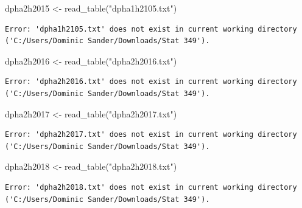 \documentclass[
  letterpaper,
  DIV=11,
  numbers=noendperiod]{scrreprt}
\newenvironment{Shaded}{\begin{snugshade}}{\end{snugshade}}
\newcommand{\FunctionTok}[1]{\textcolor[rgb]{0.28,0.35,0.67}{#1}}
\newcommand{\NormalTok}[1]{\textcolor[rgb]{0.00,0.23,0.31}{#1}}
\newcommand{\OtherTok}[1]{\textcolor[rgb]{0.00,0.23,0.31}{#1}}
\newcommand{\StringTok}[1]{\textcolor[rgb]{0.13,0.47,0.30}{#1}}
\begin{document}
\begin{Shaded}
\begin{Highlighting}[]
\NormalTok{dpha2h2015 }\OtherTok{\textless{}{-}} \FunctionTok{read\_table}\NormalTok{(}\StringTok{"dpha1h2105.txt"}\NormalTok{)}
\end{Highlighting}
\end{Shaded}

\begin{verbatim}
Error: 'dpha1h2105.txt' does not exist in current working directory ('C:/Users/Dominic Sander/Downloads/Stat 349').
\end{verbatim}

\begin{Shaded}
\begin{Highlighting}[]
\NormalTok{dpha2h2016 }\OtherTok{\textless{}{-}} \FunctionTok{read\_table}\NormalTok{(}\StringTok{"dpha2h2016.txt"}\NormalTok{)}
\end{Highlighting}
\end{Shaded}

\begin{verbatim}
Error: 'dpha2h2016.txt' does not exist in current working directory ('C:/Users/Dominic Sander/Downloads/Stat 349').
\end{verbatim}

\begin{Shaded}
\begin{Highlighting}[]
\NormalTok{dpha2h2017 }\OtherTok{\textless{}{-}} \FunctionTok{read\_table}\NormalTok{(}\StringTok{"dpha2h2017.txt"}\NormalTok{)}
\end{Highlighting}
\end{Shaded}

\begin{verbatim}
Error: 'dpha2h2017.txt' does not exist in current working directory ('C:/Users/Dominic Sander/Downloads/Stat 349').
\end{verbatim}

\begin{Shaded}
\begin{Highlighting}[]
\NormalTok{dpha2h2018 }\OtherTok{\textless{}{-}} \FunctionTok{read\_table}\NormalTok{(}\StringTok{"dpha2h2018.txt"}\NormalTok{)}
\end{Highlighting}
\end{Shaded}

\begin{verbatim}
Error: 'dpha2h2018.txt' does not exist in current working directory ('C:/Users/Dominic Sander/Downloads/Stat 349').
\end{verbatim}
\end{document}
